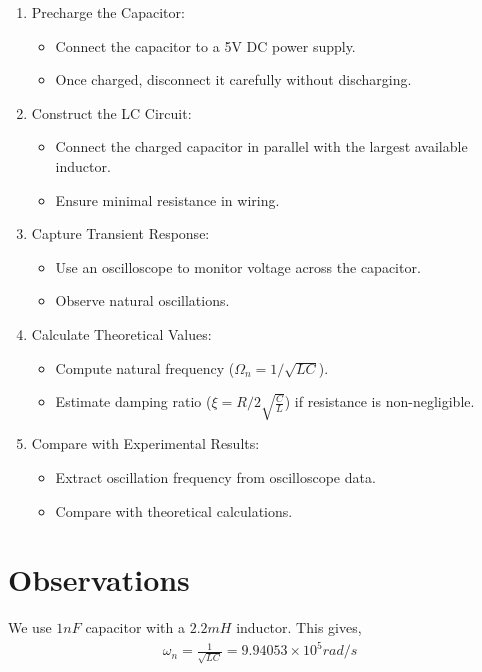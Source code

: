 \documentclass[journal]{IEEEtran}
\begin{document}
\begin{enumerate}
	\item Precharge the Capacitor:
	\begin{itemize}
		\item Connect the capacitor to a 5V DC power supply.
		\item Once charged, disconnect it carefully without discharging.
	\end{itemize}
	
	\item Construct the LC Circuit:
	\begin{itemize}
		\item Connect the charged capacitor in parallel with the largest available inductor.
		\item Ensure minimal resistance in wiring.
	\end{itemize}
	
	\item Capture Transient Response:
	\begin{itemize}
		\item Use an oscilloscope to monitor voltage across the capacitor.
		\item Observe natural oscillations.
	\end{itemize}
	
	\item Calculate Theoretical Values:
	\begin{itemize}
		\item Compute natural frequency (\(\Omega_n = 1/\sqrt{LC}\)).
		\item Estimate damping ratio (\(\xi = R/2\sqrt{\frac{C}{L}}\)) if resistance is non-negligible.
	\end{itemize}
	
	\item Compare with Experimental Results:
	\begin{itemize}
		\item Extract oscillation frequency from oscilloscope data.
		\item Compare with theoretical calculations.
	\end{itemize}

	
\end{enumerate}

\section{Observations}

We use $1nF$ capacitor with a $2.2mH$ inductor. This gives,
\begin{align*}
    \omega_n = \frac{1}{\sqrt{LC}} = 9.94053\times 10^{5} rad/s
\end{align*}
\end{document}

